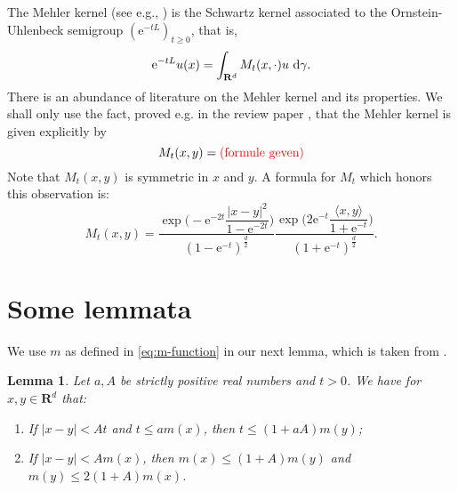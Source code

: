 \documentclass{amsart}
\newtheorem{lemma}{Lemma}
\theoremstyle{remark}
\newcommand{\D}{\,\textup{d}}
\newcommand{\la}{\langle}
\newcommand{\ra}{\rangle}
\renewcommand{\leq}{\leqslant}
\renewcommand{\leq}{\leqslant}
\renewcommand{\geq}{\geqslant}
\newcommand{\R}{\mathbf R}
\newcommand{\e}{\mathrm{e}} %
\renewcommand{\leq}{\leqslant}%
\renewcommand{\geq}{\geqslant}%
\newcommand{\red}{\color{red}}
\begin{document}
The Mehler kernel (see e.g., \cite{Sjogren1997}) is the
Schwartz kernel associated to the Ornstein-Uhlenbeck semigroup
$(\e^{-tL})_{t \geq 0}$, that is,
\begin{equation}
  \label{eq:Ornstein-Uhlenbeck-semigroup-integral}
  \e^{-tL} u(x) = \int_{\R^d} M_t(x, \cdot) u \, \D\gamma.
\end{equation}
There is an abundance of literature on the Mehler kernel and its
properties. We shall only use the fact, proved e.g. in the review paper
\cite{Sjogren1997}, that the Mehler kernel is given explicitly
by
\begin{equation*}
 M_t(x,y) = {\red\hbox{(formule geven)}}
\end{equation*}
Note that $M_t(x,y)$ is {\red symmetric in $x$ and $y$}. 
A formula for $M_t$ which honors this observation is:
\begin{equation}
  \label{eq:Mehler-kernel}
  M_t(x, y) = \frac{\exp\biggl(-\e^{-2t} \dfrac{|x - y|^2}{1
      - \e^{-2 t}}  \biggr)}{(1 - \e^{-t})^{\frac{d}2}}
  \frac{\exp\biggl(2\e^{-t} \dfrac{\la x, y \ra}{1 + \e^{-t}}
    \biggr)}{(1 + \e^{-t})^{\frac{d}2}}.
\end{equation}

\section{Some lemmata}
We use $m$ as defined in \eqref{eq:m-function} in our next lemma,
which is taken from \cite{MaasNeervenPortal2011}.
\begin{lemma}\label{lem:m-xy-equivalence}
  Let $a, A$ be strictly positive real numbers and $t > 0$. We have
  for $x, y \in \R^d$ that:
  \begin{enumerate}
  \item If $|x - y| < A t$ and $t \leq a m(x)$, then $t
    \leq (1 + aA) m(y)$;
  \item If $|x - y| < A m(x)$, then $m(x) \leq (1 +
    A) m(y)$ and $m(y) \leq 2 (1 + A) m(x)$. 
  \end{enumerate}
\end{lemma}
\end{document}
